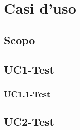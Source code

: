 \section{Casi d'uso}
\subsection{Scopo}
\subsection{UC1-Test}
\subsubsection{UC1.1-Test}
\subsection{UC2-Test}